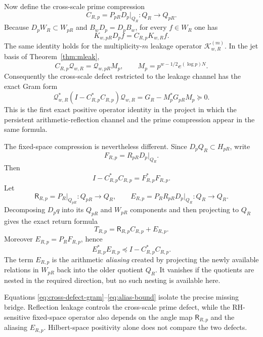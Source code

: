 \documentclass[11pt]{article}
\theoremstyle{remark}
\begin{document}
Now define the cross-scale prime compression
\[
 C_{R,p}=P_{pR}D_p\big|_{Q_R}:Q_R\longrightarrow Q_{pR}.
\]
Because $D_pW_R\subset W_{pR}$ and $B_wD_p=D_pB_w$, for every $f\in W_R$ one has
\begin{equation}\label{eq:leak-intertwine}
 \boxed{K_{w,pR}D_pf=C_{R,p}K_{w,R}f.}
\end{equation}
The same identity holds for the multiplicity-$m$ leakage operator $\mathcal K_{w,R}^{(m)}$.  In the jet basis of Theorem~\ref{thm:mleak},
\[
 C_{R,p}\mathcal Q_{w,R}=\mathcal Q_{w,pR}M_p,
 \qquad M_p=p^{w-1/2}e^{(\log p)N}.
\]
Consequently the cross-scale defect restricted to the leakage channel has the exact Gram form
\begin{equation}\label{eq:cross-defect-gram}
 \boxed{
 \mathcal Q_{w,R}^*(I-C_{R,p}^*C_{R,p})\mathcal Q_{w,R}
 =G_R-M_p^*G_{pR}M_p\succeq0.
 }
\end{equation}
This is the first exact positive operator identity in the project in which the persistent arithmetic-reflection channel and the prime compression appear in the same formula.

The fixed-space compression is nevertheless different.  Since $D_pQ_R\subset H_{pR}$, write
\[
 F_{R,p}=R_{pR}D_p\big|_{Q_R}.
\]
Then
\begin{equation}\label{eq:cross-defect-factor}
 \boxed{I-C_{R,p}^*C_{R,p}=F_{R,p}^*F_{R,p}.}
\end{equation}
Let
\[
 \mathsf R_{R,p}=P_R\big|_{Q_{pR}}:Q_{pR}\to Q_R,
 \qquad
 E_{R,p}=P_RR_{pR}D_p\big|_{Q_R}:Q_R\to Q_R.
\]
Decomposing $D_pq$ into its $Q_{pR}$ and $W_{pR}$ components and then projecting to $Q_R$ gives the exact return formula
\begin{equation}\label{eq:return-alias}
 \boxed{T_{R,p}=\mathsf R_{R,p}C_{R,p}+E_{R,p}.}
\end{equation}
Moreover $E_{R,p}=P_RF_{R,p}$, hence
\begin{equation}\label{eq:alias-bound}
 \boxed{E_{R,p}^*E_{R,p}\preceq I-C_{R,p}^*C_{R,p}.}
\end{equation}
The term $E_{R,p}$ is the arithmetic \emph{aliasing} created by projecting the newly available relations in $W_{pR}$ back into the older quotient $Q_R$.  It vanishes if the quotients are nested in the required direction, but no such nesting is available here.

Equations \eqref{eq:cross-defect-gram}--\eqref{eq:alias-bound} isolate the precise missing bridge.  Reflection leakage controls the cross-scale prime defect, while the RH-sensitive fixed-space operator also depends on the angle map $\mathsf R_{R,p}$ and the aliasing $E_{R,p}$.  Hilbert-space positivity alone does not compare the two defects.
\end{document}
